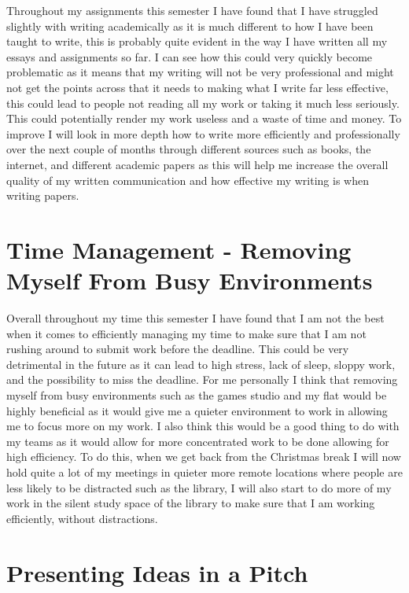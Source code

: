 \documentclass{scrartcl}
\begin{document}
Throughout my assignments this semester I have found that I have struggled slightly with writing academically as it is much different to how I have been taught to write, this is probably quite evident in the way I have written all my essays and assignments so far. I can see how this could very quickly become problematic as it means that my writing will not be very professional and might not get the points across that it needs to making what I write far less effective, this could lead to people not reading all my work or taking it much less seriously. This could potentially render my work useless and a waste of time and money. To improve I will look in more depth how to write more efficiently and professionally over the next couple of months through different sources such as books, the internet, and different academic papers as this will help me increase the overall quality of my written communication and how effective my writing is when writing papers.

\section{Time Management - Removing Myself From Busy Environments}

Overall throughout my time this semester I have found that I am not the best when it comes to efficiently managing my time to make sure that I am not rushing around to submit work before the deadline. This could be very detrimental in the future as it can lead to high stress, lack of sleep, sloppy work, and the possibility to miss the deadline. For me personally I think that removing myself from busy environments such as the games studio and my flat would be highly beneficial as it would give me a quieter environment to work in allowing me to focus more on my work. I also think this would be a good thing to do with my teams as it would allow for more concentrated work to be done allowing for high efficiency. To do this, when we get back from the Christmas break I will now hold quite a lot of my meetings in quieter more remote locations where people are less likely to be distracted such as the library, I will also start to do more of my work in the silent study space of the library to make sure that I am working efficiently, without distractions.

\section{Presenting Ideas in a Pitch}
\end{document}
